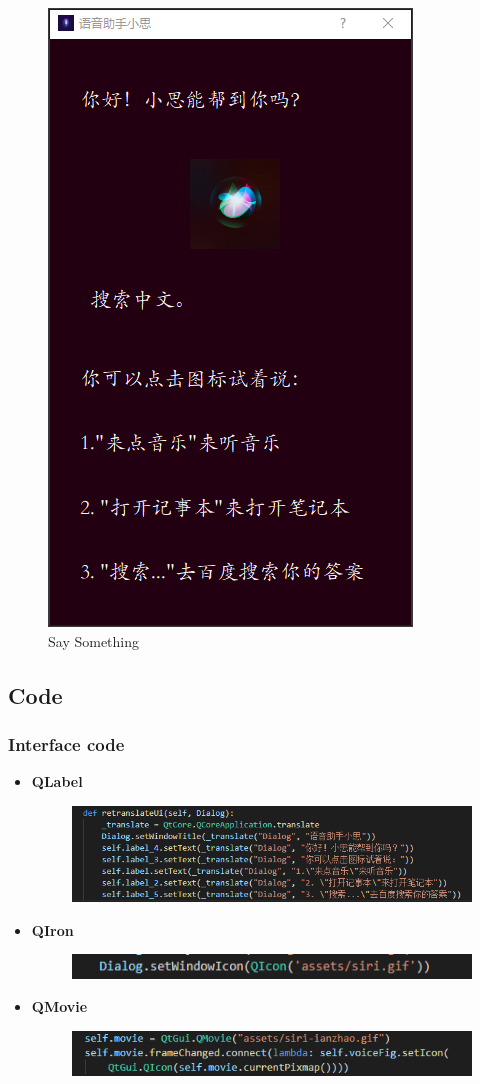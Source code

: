 \documentclass{hci}
\begin{document}
\begin{figure}[htb]
	\centering
	\includegraphics[width=0.5\linewidth]{../picture/4}
	\caption{Say Something}
	\label{figure3}
\end{figure}

\subsection{Code}
\subsubsection{Interface code}
\begin{itemize}
	\item \textbf{QLabel}
	\begin{figure}[htb]
		\centering
		\includegraphics[width=0.9\linewidth]{../picture/5}
		\label{figure5}
	\end{figure}
	\item \textbf{QIron}
	\begin{figure}[h!]
		\centering
		\includegraphics[width=0.9\linewidth]{../picture/7}
		\label{figure7}
	\end{figure}
    \newpage
	\item \textbf{QMovie}
	\begin{figure}[h!]
		\centering
		\includegraphics[width=0.9\linewidth]{../picture/6}
		\label{figure6}
	\end{figure}
	
\end{itemize}
\end{document}
